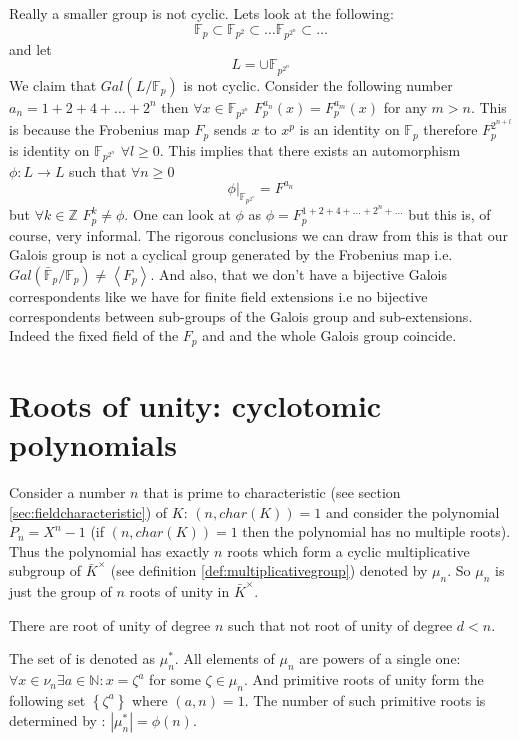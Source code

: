 Really a smaller group is not cyclic. Lets look at the following:
\[
\mathbb{F}_p \subset \mathbb{F}_{p^2} \subset \dots
\mathbb{F}_{p^{2^n}} \subset \dots
\]
and let
\[
L = \cup \mathbb{F}_{p^{2^n}}
\]
We claim that $Gal\left(L/\mathbb{F}_p\right)$ is not cyclic. Consider
the following number $a_n = 1+ 2 + 4 + \dots + 2^n$ then $\forall x
\in \mathbb{F}_{p^{2^n}}$
$F_p^{a_n}\left(x\right) = F_p^{a_m}\left(x\right)$ for any $m >
n$. This is because the Frobenius map $F_p$ sends $x$ to $x^p$ is an
identity on $\mathbb{F}_p$ therefore $F_p^{2^{n+l}}$ is identity on
$\mathbb{F}_{p^{2^n}}$ $\forall l \ge 0$. This implies that
there exists an automorphism $\phi: L \to L$ such that $\forall n
\ge 0$
\[
\left.\phi\right|_{\mathbb{F}_{p^{2^n}}} = F^{a_n}
\]
but $\forall k \in \mathbb{Z}$ $F_p^k \ne \phi$. One can look at
$\phi$ as $\phi = F_p^{1+2+4+ \dots + 2^n + \dots}$ but this is, of
course, very informal. The rigorous conclusions we can draw from this
is that our Galois group is not a cyclical group generated by the
Frobenius map i.e.
$Gal\left(\bar{\mathbb{F}}_p/\mathbb{F}_p\right) \ne
\left<F_p\right>$. And also, that we don't have a bijective Galois
correspondents like we have for finite field extensions i.e no
bijective correspondents  between sub-groups 
of the Galois group and sub-extensions. Indeed the fixed field of the
$F_p$ and and the whole Galois group coincide.  

\section{ Roots of unity: cyclotomic polynomials}
Consider a number $n$ that is prime to characteristic (see section
\ref{sec:fieldcharacteristic}) of $K$:
$\left(n, char\left(K\right)\right) = 1$ and consider the polynomial
$P_n = X^n - 1$ (if $\left(n, char\left(K\right)\right) = 1$ then the
polynomial has no multiple roots). Thus the polynomial has exactly $n$
roots which form a cyclic multiplicative subgroup of $\bar{K}^\times$
(see definition \ref{def:multiplicativegroup})
denoted by $\mu_n$. So $\mu_n$ is just the group of $n$ roots of unity
in $\bar{K}^\times$.

\begin{definition}
  There are root of unity of degree $n$ such that not root of unity of
  degree $d < n$.
  \label{def:primitiverootsofunity}
\end{definition}

The set of  is denoted as
$\mu_n^*$. All elements of $\mu_n$ are powers of a single one:
$\forall x \in \nu_n \exists a \in \mathbb{N}: x = \zeta^a$ for some
$\zeta \in \mu_n$. And primitive roots of unity form the following set
$\left\{\zeta^a\right\}$ where $\left(a, n\right) = 1$. The number of
such primitive roots is determined by :
$\left|\mu_n^*\right| = \phi\left(n\right)$.

